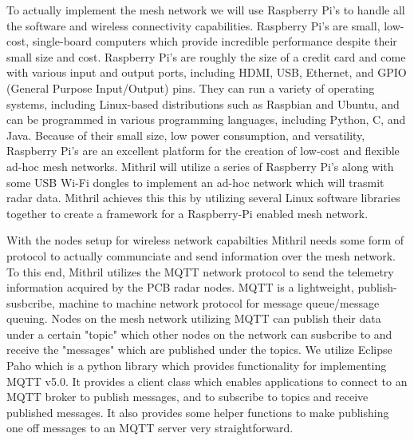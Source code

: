   To actually implement the mesh network we will use Raspberry Pi's to handle all the software and wireless connectivity capabilities. Raspberry Pi's are small, low-cost, single-board computers which provide incredible performance despite their small size and cost. Raspberry Pi's are roughly the size of a credit card and come with various input and output ports, including HDMI, USB, Ethernet, and GPIO (General Purpose Input/Output) pins. They can run a variety of operating systems, including Linux-based distributions such as Raspbian and Ubuntu, and can be programmed in various programming languages, including Python, C, and Java. Because of their small size, low power consumption, and versatility, Raspberry Pi's are an excellent platform for the creation of low-cost and flexible ad-hoc mesh networks. Mithril will utilize a series of Raspberry Pi's along with some USB Wi-Fi dongles to implement an ad-hoc network which will trasmit radar data. Mithril achieves this this by utilizing several Linux software libraries together to create a framework for a Raspberry-Pi enabled mesh network.

  With the nodes setup for wireless network capabilties Mithril needs some form of protocol to actually communciate and send information over the mesh network. To this end, Mithril utilizes the MQTT network protocol to send the telemetry information acquired by the PCB radar nodes. MQTT is a lightweight, publish-susbcribe, machine to machine network protocol for message queue/message queuing. Nodes on the mesh network utilizing MQTT can publish their data under a certain "topic" which other nodes on the network can susbcribe to and receive the "messages" which are published under the topics. We utilize Eclipse Paho which is a python library which provides functionality for implementing MQTT v5.0. It provides a client class which enables applications to connect to an MQTT broker to publish messages, and to subscribe to topics and receive published messages. It also provides some helper functions to make publishing one off messages to an MQTT server very straightforward.

